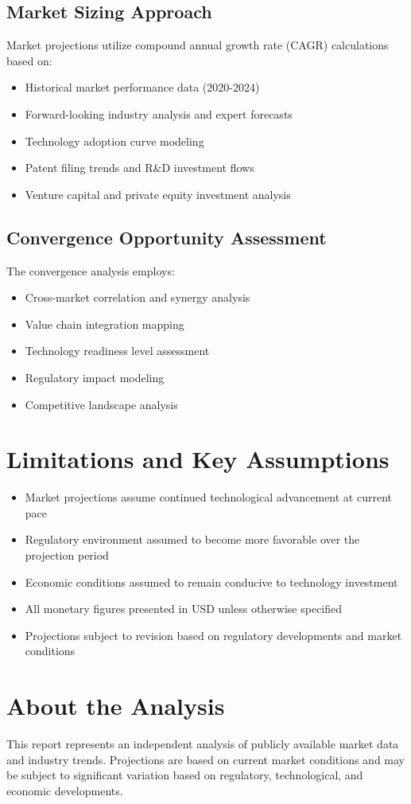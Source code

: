 \documentclass[11pt,a4paper]{report}
\begin{document}
\subsection{Market Sizing Approach}
Market projections utilize compound annual growth rate (CAGR) calculations based on:
\begin{itemize}
    \item Historical market performance data (2020-2024)
    \item Forward-looking industry analysis and expert forecasts
    \item Technology adoption curve modeling
    \item Patent filing trends and R\&D investment flows
    \item Venture capital and private equity investment analysis
\end{itemize}

\subsection{Convergence Opportunity Assessment}
The convergence analysis employs:
\begin{itemize}
    \item Cross-market correlation and synergy analysis
    \item Value chain integration mapping
    \item Technology readiness level assessment
    \item Regulatory impact modeling
    \item Competitive landscape analysis
\end{itemize}

\section{Limitations and Key Assumptions}

\begin{itemize}
    \item Market projections assume continued technological advancement at current pace
    \item Regulatory environment assumed to become more favorable over the projection period
    \item Economic conditions assumed to remain conducive to technology investment
    \item All monetary figures presented in USD unless otherwise specified
    \item Projections subject to revision based on regulatory developments and market conditions
\end{itemize}

\section{About the Analysis}

This report represents an independent analysis of publicly available market data and industry trends. Projections are based on current market conditions and may be subject to significant variation based on regulatory, technological, and economic developments.
\end{document}

